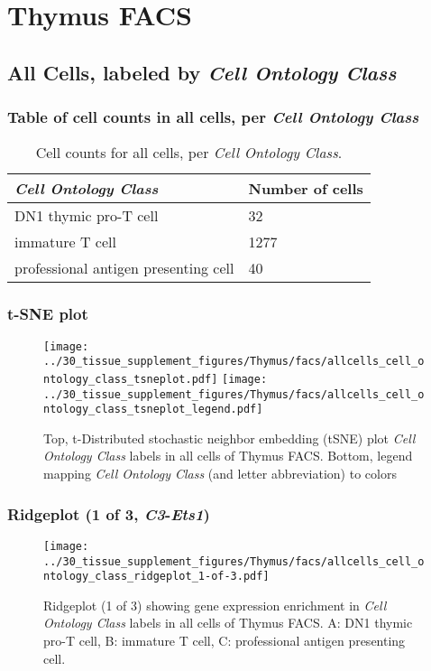 \clearpage
\section{Thymus FACS}

\subsection{All Cells, labeled by \emph{Cell Ontology Class}}
\subsubsection{Table of cell counts in all cells, per \emph{Cell Ontology Class}}\begin{table}[h]
\centering
\label{my-label}
\begin{tabular}{@{}ll@{}}
\toprule

\emph{Cell Ontology Class}& Number of cells \\ \midrule
DN1 thymic pro-T cell & 32 \\

immature T cell & 1277 \\

professional antigen presenting cell & 40 \\
\bottomrule
\end{tabular}
\caption{Cell counts for all cells, per \emph{Cell Ontology Class}.}
\end{table}

\clearpage
\subsubsection{t-SNE plot}
\begin{figure}[h]
\centering
\texttt{[image: ../30\_tissue\_supplement\_figures/Thymus/facs/allcells\_cell\_ontology\_class\_tsneplot.pdf]}
\texttt{[image: ../30\_tissue\_supplement\_figures/Thymus/facs/allcells\_cell\_ontology\_class\_tsneplot\_legend.pdf]}
\caption{Top, t-Distributed stochastic neighbor embedding (tSNE) plot  \emph{Cell Ontology Class} labels in all cells of Thymus FACS. Bottom, legend mapping \emph{Cell Ontology Class} (and letter abbreviation) to colors}
\end{figure}


\clearpage

\subsubsection{Ridgeplot (1 of 3, \emph{C3}-\emph{Ets1})}
\begin{figure}[h]
\centering
\texttt{[image: ../30\_tissue\_supplement\_figures/Thymus/facs/allcells\_cell\_ontology\_class\_ridgeplot\_1-of-3.pdf]}

\caption{ Ridgeplot (1 of 3)  showing gene expression enrichment in \emph{Cell Ontology Class} labels in all cells of Thymus FACS. A: DN1 thymic pro-T cell, B: immature T cell, C: professional antigen presenting cell.}
\end{figure}


